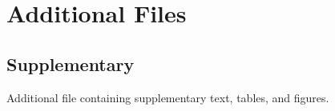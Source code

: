 \documentclass[twocolumn]{bmcart}%
\begin{document}
\begin{backmatter}
\begin{table*}[!h]
\end{table*}


\section*{Additional Files}
  \subsection*{Supplementary}
    Additional file containing supplementary text, tables, and figures.


\end{backmatter}
\end{document}
